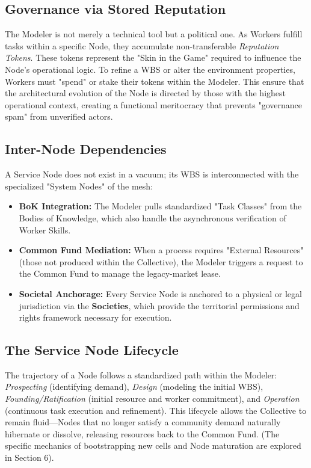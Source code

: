\subsection{Governance via Stored Reputation}
The Modeler is not merely a technical tool but a political one. As Workers fulfill tasks within a specific Node, they accumulate non-transferable \textit{Reputation Tokens}. These tokens represent the "Skin in the Game" required to influence the Node’s operational logic. To refine a WBS or alter the environment properties, Workers must "spend" or stake their tokens within the Modeler. This ensure that the architectural evolution of the Node is directed by those with the highest operational context, creating a functional meritocracy that prevents "governance spam" from unverified actors.

\subsection{Inter-Node Dependencies}
A Service Node does not exist in a vacuum; its WBS is interconnected with the specialized "System Nodes" of the mesh:
\begin{itemize}[leftmargin=*]
    \item \textbf{BoK Integration:} The Modeler pulls standardized "Task Classes" from the Bodies of Knowledge, which also handle the asynchronous verification of Worker Skills.
    \item \textbf{Common Fund Mediation:} When a process requires "External Resources" (those not produced within the Collective), the Modeler triggers a request to the Common Fund to manage the legacy-market lease.
    \item \textbf{Societal Anchorage:} Every Service Node is anchored to a physical or legal jurisdiction via the \textbf{Societies}, which provide the territorial permissions and rights framework necessary for execution.
\end{itemize}

\subsection{The Service Node Lifecycle}
The trajectory of a Node follows a standardized path within the Modeler: \textit{Prospecting} (identifying demand), \textit{Design} (modeling the initial WBS), \textit{Founding/Ratification} (initial resource and worker commitment), and \textit{Operation} (continuous task execution and refinement). This lifecycle allows the Collective to remain fluid—Nodes that no longer satisfy a community demand naturally hibernate or dissolve, releasing resources back to the Common Fund. (The specific mechanics of bootstrapping new cells and Node maturation are explored in Section 6).

